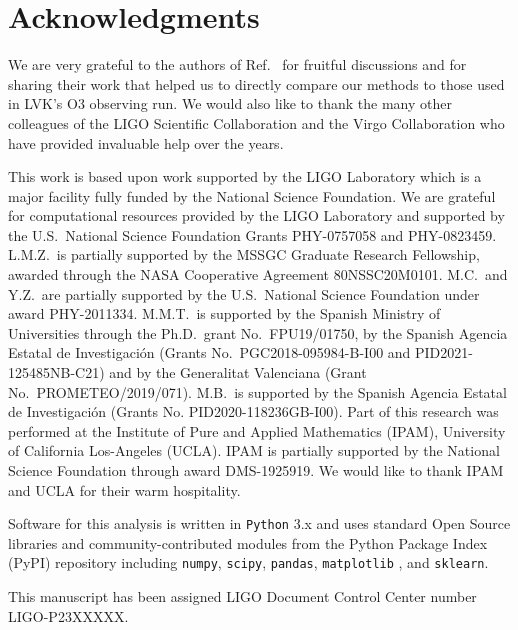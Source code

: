 \section*{Acknowledgments}


We are very grateful to the authors of Ref.~\cite{Chatterjee:2019avs} for fruitful discussions and for sharing their work that helped us to directly compare
our methods to those used in \ac{LVK}'s \ac{O3} observing run. We would also like to thank the many other colleagues of the LIGO Scientific Collaboration and
the Virgo Collaboration who have provided invaluable help over the years.

This work is based upon work supported by the LIGO Laboratory which is a major facility fully funded by the National Science Foundation. We are grateful for
computational resources provided by the LIGO Laboratory and supported by the U.S.\ National Science Foundation Grants PHY-0757058 and PHY-0823459. L.M.Z.\ is partially
supported by the MSSGC Graduate Research Fellowship, awarded through the NASA Cooperative Agreement 80NSSC20M0101. M.C.\ and Y.Z.\ are partially supported by the U.S.\
National Science Foundation under award PHY-2011334. M.M.T.\ is supported by the Spanish Ministry of Universities through the Ph.D.\ grant No.\ FPU19/01750, by the
Spanish Agencia Estatal de Investigaci\'on (Grants No.\ PGC2018-095984-B-I00 and PID2021-125485NB-C21) and by the Generalitat Valenciana (Grant No.\ PROMETEO/2019/071).
M.B.\ is supported by the Spanish Agencia Estatal de Investigaci\'on (Grants No. PID2020-118236GB-I00). Part of this research was performed at the Institute of Pure and
Applied Mathematics (IPAM),  University of California Los-Angeles (UCLA). IPAM is partially supported by the National Science Foundation through award
DMS-1925919. We would like to thank IPAM and UCLA for their warm hospitality. 

Software for this analysis is written in \texttt{Python} 3.x  and uses standard Open Source libraries and community-contributed modules from the Python Package Index (PyPI) repository  including \texttt{numpy}, \texttt{scipy}, \texttt{pandas}, \texttt{matplotlib} \cite{Hunter:2007ouj}, and \texttt{sklearn}.

This manuscript has been assigned LIGO Document Control Center number LIGO-P23XXXXX.





